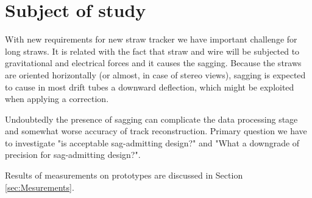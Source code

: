  \section{Subject of study}
	
	With new requirements for new straw tracker we have important challenge for long straws. It  is related with the fact that straw and wire will be subjected to gravitational and electrical forces and it causes the sagging. Because the straws are oriented horizontally (or almost, in case of stereo views), sagging is expected to cause in most drift tubes a downward deflection, which might be exploited
when applying a correction.

	Undoubtedly the presence of sagging can complicate the data processing stage and somewhat worse accuracy of track reconstruction. Primary question we have to investigate "is acceptable sag-admitting design?" and "What a downgrade of precision for sag-admitting design?".
	
	Results of measurements on prototypes are discussed in Section \ref{sec:Mesurements}.
	